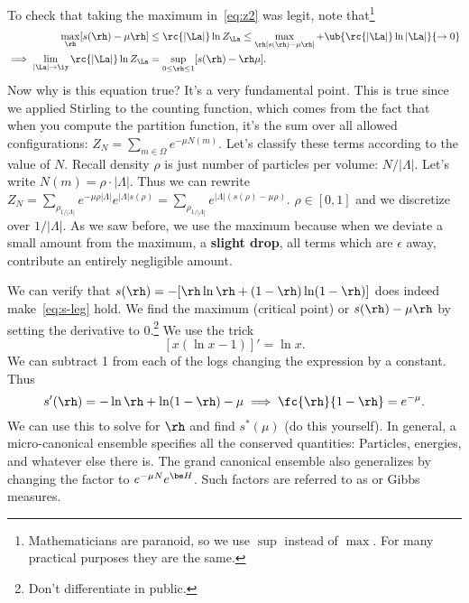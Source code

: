 To check that taking the maximum in~\eqref{eq:z2} was legit, note that\footnote{Mathematicians are paranoid, so we use $\sup$ instead of $\max$. For many practical purposes they are the same.}
\begin{align*}%
\max_{\rh}[s(\rh) - \mu \rh] &\le \rc{|\La|}\ln Z_{\La} \le \max_\rh [s(\rh)-\mu \rh] + \ub{\rc{|\La|}\ln |\La|}{\to 0}\\
\implies
\lim_{|\La|\to \iy} \rc{|\La|}\ln Z_{\La} &= \sup_{0\le \rh\le 1} [s(\rh) - \rh \mu].
\end{align*}
Now why is this equation true? It's a very fundamental point. This is true since we applied Stirling to the counting function, which comes from the fact that when you compute the partition function, it's the sum over all allowed configurations: $Z_N = \sum_{m \in \Omega} e^{-\mu N(m)}$. Let's classify these terms according to the value of $N$. Recall density $\rho$ is just number of particles per volume: $N/ |\Lambda|$. Let's write $N(m) = \rho\cdot |\Lambda|$. Thus we can rewrite $Z_N = \sum_{\rho_{1/|\Lambda|}} e^{-\mu \rho |\Lambda|}e^{|\Lambda|s(\rho)} = \sum_{\rho_{1/|\Lambda|}} e^{|\Lambda|(s(\rho) - \mu \rho)}$. $\rho \in [0, 1]$ and we discretize over $1/|\Lambda|$. As we saw before, we use the maximum because when we deviate a small amount from the maximum, a \textbf{slight drop}, all terms which are $\epsilon$ away, contribute an entirely negligible amount. 

We can verify that  $s(\rh) = -[\rh\ln \rh +(1-\rh) \ln (1-\rh)]$
does indeed make~\eqref{eq:s-leg} hold. We find the maximum (critical point) or $s(\rh)-\mu \rh$ by setting the derivative to 0.\footnote{Don't differentiate in public.} 
We use the trick 
\[[x(\ln x-1)]'=\ln x.\] We can subtract 1 from each of the logs changing the expression by a constant. Thus
\[
s'(\rh) = -\ln \rh +\ln (1-\rh) - \mu \implies \fc{\rh}{1-\rh}=e^{-\mu}.
\]
We can use this to solve for $\rh$ and find $s^*(\mu)$ (do this yourself).
In general, a micro-canonical ensemble specifies all the conserved quantities: Particles, energies, and whatever else there is. The grand canonical ensemble also generalizes by changing the factor to $e^{-\mu N} e^{\be H}$.
Such factors are referred to as  %
or Gibbs measures.

